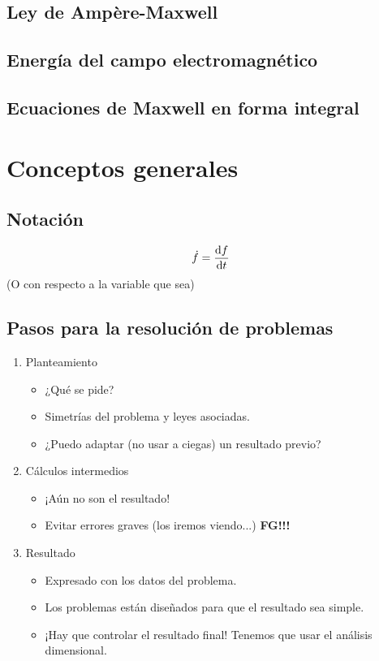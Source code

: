 \documentclass[a4paper]{book}
\numberwithin{figure}{chapter}
\numberwithin{equation}{chapter}
\newcommand{\errorGrave}{\textbf{FG!!!}}
\begin{document}
\section{Ley de Ampère-Maxwell}

\section{Energía del campo electromagnético}

\section{Ecuaciones de Maxwell en forma integral}



\appendix

\chapter{Conceptos generales}


\section{Notación}
\[\dot f = \dv{f}{t}\]
(O con respecto a la variable que sea)

\section{Pasos para la resolución de problemas}

\begin{enumerate}
	\item Planteamiento \begin{itemize}
		      \item ¿Qué se pide?
		      \item Simetrías del problema y leyes asociadas.
		      \item ¿Puedo adaptar (no usar a ciegas) un resultado previo?
	      \end{itemize}
	\item Cálculos intermedios \begin{itemize}
		      \item ¡Aún no son el resultado!
		      \item Evitar errores graves (los iremos viendo...) \errorGrave
	      \end{itemize}
	\item Resultado \begin{itemize}
		      \item Expresado con los datos del problema.
		      \item Los problemas están diseñados para que el resultado sea simple.
		      \item ¡Hay que controlar el resultado final! Tenemos que usar el análisis dimensional.
	      \end{itemize}
\end{enumerate}
\end{document}
